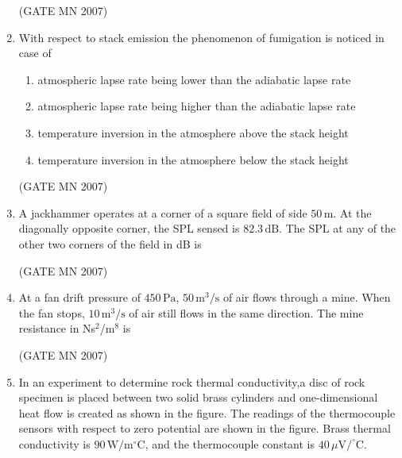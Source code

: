 \documentclass[journal]{IEEEtran}
\begin{document}
\begin{enumerate}
\hfill (GATE MN 2007)


\item With respect to stack emission the phenomenon of fumigation is noticed in case of  
\begin{enumerate}
    \item atmospheric lapse rate being lower than the adiabatic lapse rate
    \item atmospheric lapse rate being higher than the adiabatic lapse rate
    \item temperature inversion in the atmosphere above the stack height
    \item temperature inversion in the atmosphere below the stack height
\end{enumerate}

\hfill (GATE MN 2007)

\item A jackhammer operates at a corner of a square field of side $50\,\text{m}$.  
At the diagonally opposite corner, the SPL sensed is $82.3\,\text{dB}$.  
The SPL at any of the other two corners of the field in dB is  
\begin{enumerate}
\end{enumerate}

\hfill (GATE MN 2007)


\item At a fan drift pressure of $450\,\text{Pa}$, $50\,\text{m}^3/\text{s}$ of air flows through a mine.  
When the fan stops, $10\,\text{m}^3/\text{s}$ of air still flows in the same direction.  
The mine resistance in Ns$^2$/m$^8$ is  
\begin{enumerate}
\end{enumerate}

\hfill (GATE MN 2007)

\item In an experiment to determine rock thermal conductivity,a disc of rock specimen is placed between two solid brass cylinders and one-dimensional heat flow is created as shown in the figure.  
The readings of the thermocouple sensors with respect to zero potential are shown in the figure.  
Brass thermal conductivity is $90\,\text{W/m$^\circ$C}$, and the thermocouple constant is $40\,\mu\text{V}/^\circ$C.  


\end{enumerate}
\end{document}
